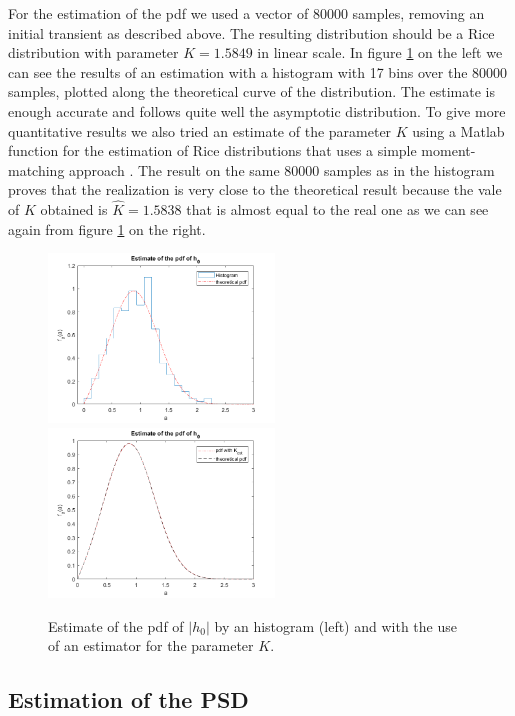\documentclass[a4paper,11.5pt]{article}
\begin{document}
For the estimation of the pdf we used a vector of 80000 samples, removing an initial transient as described above. The resulting distribution should be a Rice distribution with parameter $K=1.5849$ in linear scale. In figure \ref{fig:histest} on the left we can see the results of an estimation with a histogram with 17 bins over the 80000 samples, plotted along the theoretical curve of the distribution. The estimate is enough accurate and follows quite well the asymptotic distribution. To give more quantitative results we also tried an estimate of the parameter $K$ using a Matlab function for the estimation of Rice distributions that uses a simple moment-matching approach \cite{rice}. The result on the same 80000 samples as in the histogram proves that the realization is very close to the theoretical result because the vale of $K$ obtained is $\hat{K}=1.5838$ that is almost equal to the real one as we can see again from figure \ref{fig:histest} on the right.

\begin{figure}[ht]
	\begin{center}    
		\includegraphics[width=6cm]{figs/hist-pdf.png}
		\includegraphics[width=6cm]{figs/ML-est.png}
		\caption{Estimate of the pdf of $|h_0|$ by an histogram (left) and with the use of an estimator for the parameter $K$.}
		\label{fig:histest}
	\end{center}
\end{figure}

\subsection*{Estimation of the PSD}
\end{document}
